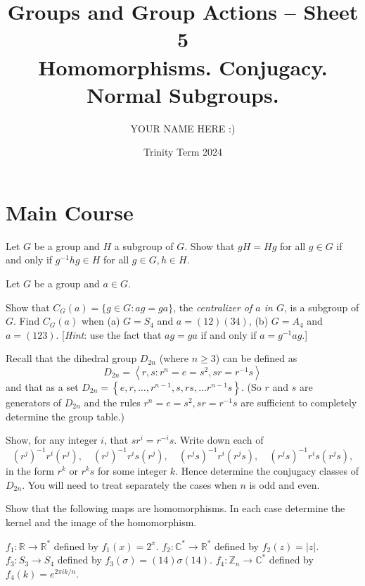 \documentclass[answers]{exam}
\title{Groups and Group Actions -- Sheet 5\\Homomorphisms. Conjugacy. Normal Subgroups.}
\author{YOUR NAME HERE :)}
\date{Trinity Term 2024}
\begin{document}
\maketitle
\section*{Main Course}
\begin{questions}
\question%
Let $G$ be a group and $H$ a subgroup of $G$. Show that $g H=H g$ for all $g \in G$ if and only if $g^{-1} h g \in H$ for all $g \in G, h \in H$.

 
 
\question%
Let $G$ be a group and $a \in G$.
\begin{subparts}
\subpart Show that $C_{G}(a)=\{g \in G: a g=g a\}$, the \emph{centralizer of $a$ in $G$}, is a subgroup of $G$.
\subpart Find $C_{G}(a)$ when (a) $G=S_{4}$ and $a=(12)(34)$, (b) $G=A_{4}$ and $a=(123)$. [\emph{Hint}: use the fact that $a g=g a$ if and only if $a=g^{-1} a g$.]
\end{subparts}



\question%
Recall that the dihedral group $D_{2 n}$ (where $n \geqslant 3$) can be defined as \[
	D_{2 n}=\left\langle r, s: r^{n}=e=s^{2}, s r=r^{-1} s\right\rangle
\] and that as a set $D_{2 n}=\left\{e, r, \ldots, r^{n-1}, s, r s, \ldots r^{n-1} s\right\}$. (So $r$ and $s$ are generators of $D_{2 n}$ and the rules $r^{n}=e=s^{2}, s r=r^{-1} s$ are sufficient to completely determine the group table.)
\begin{subparts}
\subpart Show, for any integer $i$, that $s r^{i}=r^{-i} s$.
\subpart Write down each of \[
	\left(r^{j}\right)^{-1} r^{i}\left(r^{j}\right), \quad\left(r^{j}\right)^{-1} r^{i} s\left(r^{j}\right), \quad\left(r^{j} s\right)^{-1} r^{i}\left(r^{j} s\right), \quad\left(r^{j} s\right)^{-1} r^{i} s\left(r^{j} s\right),
\] in the form $r^{k}$ or $r^{k} s$ for some integer $k$.
\subpart Hence determine the conjugacy classes of $D_{2 n}$. You will need to treat separately the cases when $n$ is odd and even.
\end{subparts}



\question%
Show that the following maps are homomorphisms. In each case determine the kernel and the image of the homomorphism.
\begin{subparts}
\subpart $f_{1}: \mathbb{R} \rightarrow \mathbb{R}^{*}$ defined by $f_{1}(x)=2^{x}$.
\subpart $f_{2}: \mathbb{C}^{*} \rightarrow \mathbb{R}^{*}$ defined by $f_{2}(z)=|z|$.
\subpart $f_{3}: S_{3} \rightarrow S_{4}$ defined by $f_{3}(\sigma)=(14) \sigma(14)$.
\subpart $f_{4}: \mathbb{Z}_{n} \rightarrow \mathbb{C}^{*}$ defined by $f_{4}(k)=e^{2 \pi i k / n}$.
\end{subparts}




\end{questions}
\end{document}
